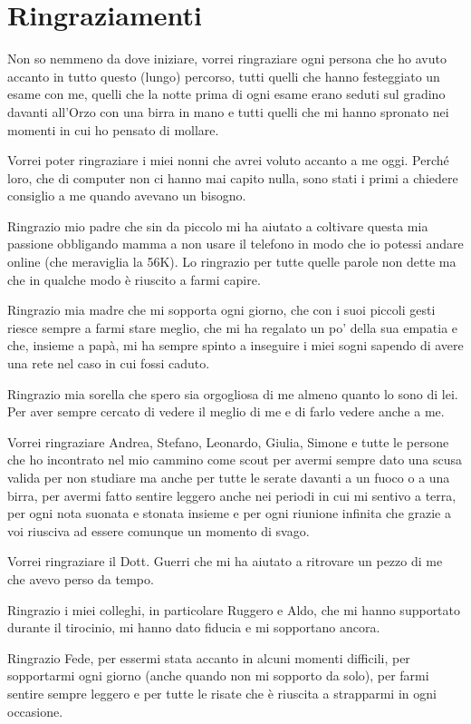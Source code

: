 \section*{Ringraziamenti}

Non so nemmeno da dove iniziare, vorrei ringraziare ogni persona che ho avuto accanto in tutto questo (lungo) percorso, tutti quelli che hanno festeggiato un esame con me, quelli che la notte prima di ogni esame erano seduti sul gradino davanti all'Orzo con una birra in mano e tutti quelli che mi hanno spronato nei momenti in cui ho pensato di mollare.

Vorrei poter ringraziare i miei nonni che avrei voluto accanto a me oggi. Perché loro, che di computer non ci hanno mai capito nulla, sono stati i primi a chiedere consiglio a me quando avevano un bisogno.

Ringrazio mio padre che sin da piccolo mi ha aiutato a coltivare questa mia passione obbligando mamma a non usare il telefono in modo che io potessi andare online (che meraviglia la 56K). Lo ringrazio per tutte quelle parole non dette ma che in qualche modo è riuscito a farmi capire.

Ringrazio mia madre che mi sopporta ogni giorno, che con i suoi piccoli gesti riesce sempre a farmi stare meglio, che mi ha regalato un po' della sua empatia e che, insieme a papà, mi ha sempre spinto a inseguire i miei sogni sapendo di avere una rete nel caso in cui fossi caduto.

Ringrazio mia sorella che spero sia orgogliosa di me almeno quanto lo sono di lei. Per aver sempre cercato di vedere il meglio di me e di farlo vedere anche a me.

Vorrei ringraziare Andrea, Stefano, Leonardo, Giulia, Simone e tutte le persone che ho incontrato nel mio cammino come scout per avermi sempre dato una scusa valida per non studiare ma anche per tutte le serate davanti a un fuoco o a una birra, per avermi fatto sentire leggero anche nei periodi in cui mi sentivo a terra, per ogni nota suonata e stonata insieme e per ogni riunione infinita che grazie a voi riusciva ad essere comunque un momento di svago.

Vorrei ringraziare il Dott. Guerri che mi ha aiutato a ritrovare un pezzo di me che avevo perso da tempo.

Ringrazio i miei colleghi, in particolare Ruggero e Aldo, che mi hanno supportato durante il tirocinio, mi hanno dato fiducia e mi sopportano ancora. 

Ringrazio Fede, per essermi stata accanto in alcuni momenti difficili, per sopportarmi ogni giorno (anche quando non mi sopporto da solo), per farmi sentire sempre leggero e per tutte le risate che è riuscita a strapparmi in ogni occasione.

